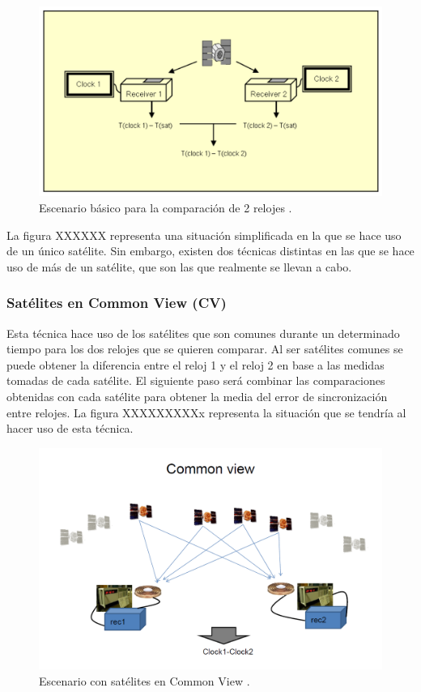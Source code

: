 \begin{figure}
	\centering
	\includegraphics[width=1\textwidth]{imagenes/2clockscompare.PNG}
	\caption{\label{fig1}Escenario básico para la comparación de 2 relojes \cite{gnss}.}
\end{figure}

La figura XXXXXX representa una situación simplificada en la que se hace uso de un único satélite. Sin embargo, existen dos técnicas distintas en las que se hace uso de más de un satélite, que son las que realmente se llevan a cabo.

\subsubsection{Satélites en Common View (CV)}
Esta técnica hace uso de los satélites que son comunes durante un determinado tiempo para los dos relojes que se quieren comparar. Al ser satélites comunes se puede obtener la diferencia entre el reloj 1 y el reloj 2 en base a las medidas tomadas de cada satélite. El siguiente paso será combinar las comparaciones obtenidas con cada satélite para obtener la media del error de sincronización entre relojes. La figura XXXXXXXXXx representa la situación que se tendría al hacer uso de esta técnica.\newline

\begin{figure}
	\centering
	\includegraphics[width=1\textwidth]{imagenes/commonview.PNG}
	\caption{\label{fig1}Escenario con satélites en Common View \cite{timetransfer}.}
\end{figure}

